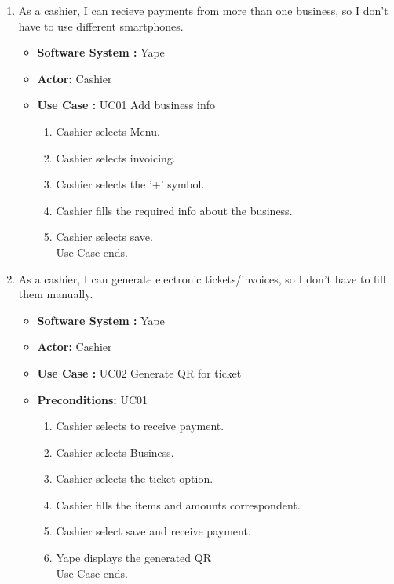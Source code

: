 \documentclass{article}
\begin{document}
\begin{enumerate}

    \item As a cashier, I can recieve payments from more than one business, so I don't have to use different smartphones. 
    \begin{itemize}
        \item \textbf{Software System :} Yape 
        \item \textbf{Actor: } Cashier
        \item \textbf{Use Case : } UC01 Add business info
        \begin{enumerate}
            \item Cashier selects Menu.
            \item Cashier selects invoicing.
            \item Cashier selects the '+' symbol.
            \item Cashier fills the required info about the business.
            \item Cashier selects save.\\
            Use Case ends.
        \end{enumerate}
    \end{itemize}

    \item As a cashier, I can generate electronic tickets/invoices, so I don't have to fill them manually. 
    \begin{itemize}
        \item \textbf{Software System :} Yape
        \item \textbf{Actor: } Cashier
        \item \textbf{Use Case : } UC02 Generate QR for ticket
        \item \textbf{Preconditions: } UC01
	\begin{enumerate}
            \item Cashier selects to receive payment.
            \item Cashier selects Business.
            \item Cashier selects the ticket option.
            \item Cashier fills the items and amounts correspondent.
            \item Cashier select save and receive payment.
            \item Yape displays the generated QR\\
            Use Case ends.
        \end{enumerate}
    \end{itemize}
    

\end{enumerate}
\end{document}
